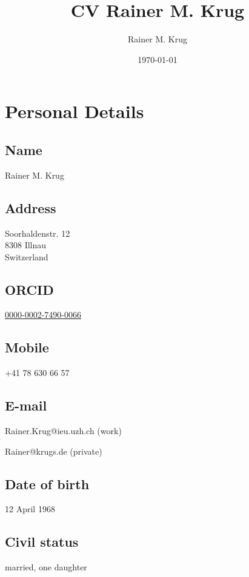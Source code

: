 \documentclass[a4paper]{article}
\author{Rainer M. Krug}
\date{\today}
\title{CV Rainer M. Krug}
\begin{document}
\maketitle


\section{Personal Details}

\subsection{Name}

Rainer M. Krug

\subsection{Address}

Soorhaldenstr. 12 \\
8308 Illnau \\
Switzerland

\subsection{ORCID}

\href{https://orcid.org/0000-0002-7490-0066}{0000-0002-7490-0066}

\subsection{Mobile}

+41 78 630 66 57

\subsection{E-mail}

Rainer.Krug@ieu.uzh.ch (work)

Rainer@krugs.de (private)

\subsection{Date of birth}

12 April 1968

\subsection{Civil status}

married, one daughter
\end{document}
